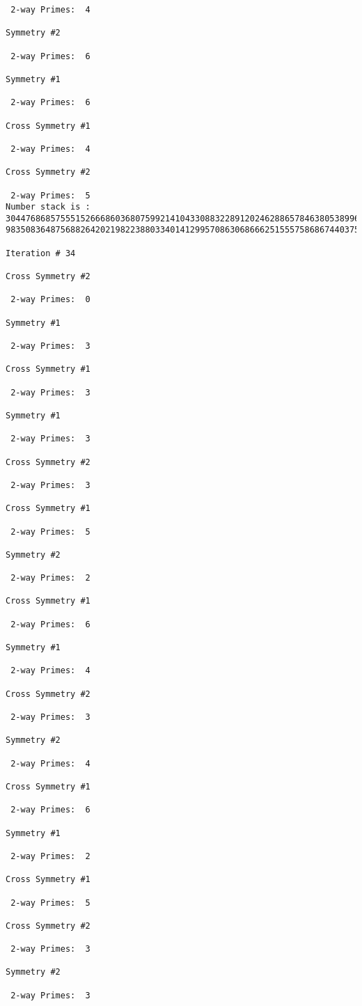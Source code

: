\begin{verbatim}
 2-way Primes: 	4

Symmetry #2

 2-way Primes: 	6

Symmetry #1

 2-way Primes: 	6

Cross Symmetry #1

 2-way Primes: 	4

Cross Symmetry #2

 2-way Primes: 	5
Number stack is :
30447686857555152666860368075992141043308832289120246288657846380538996794608835958544046240163340857
98350836487568826420219822388033401412995708630686662515557586867440375804336104264044585953880649769

Iteration #	34

Cross Symmetry #2

 2-way Primes: 	0

Symmetry #1

 2-way Primes: 	3

Cross Symmetry #1

 2-way Primes: 	3

Symmetry #1

 2-way Primes: 	3

Cross Symmetry #2

 2-way Primes: 	3

Cross Symmetry #1

 2-way Primes: 	5

Symmetry #2

 2-way Primes: 	2

Cross Symmetry #1

 2-way Primes: 	6

Symmetry #1

 2-way Primes: 	4

Cross Symmetry #2

 2-way Primes: 	3

Symmetry #2

 2-way Primes: 	4

Cross Symmetry #1

 2-way Primes: 	6

Symmetry #1

 2-way Primes: 	2

Cross Symmetry #1

 2-way Primes: 	5

Cross Symmetry #2

 2-way Primes: 	3

Symmetry #2

 2-way Primes: 	3


\end{verbatim}
